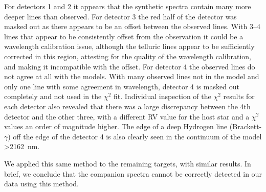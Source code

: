 \documentclass[fleqn,usenatbib]{mnras}
\begin{document}
For detectors 1 and 2 it appears that the synthetic spectra contain many more deeper lines than observed. For detector 3 the red half of the detector was masked out as there appears to be an offset between the observed lines. With 3--4 lines that appear to be consistently offset from the observation it could be a wavelength calibration issue, although the telluric lines appear to be sufficiently corrected in this region, attesting for the quality of the wavelength calibration, and making it incompatible with the offset. For detector 4 the observed lines do not agree at all with the models. With many observed lines not in the model and only one line with some agreement in wavelength, detector 4 is masked out completely and not used in the \(\chi^2\) fit. Individual inspection of the \(\chi^2\) results for each detector also revealed that there was a large discrepancy between the 4th detector and the other three, with a different RV value for the host star and a \(\chi^2\) values an order of magnitude higher. The edge of a deep Hydrogen line (Brackett-\(\gamma\)) off the edge of the detector 4 is also clearly seen in the continuum of the model >2162~nm.

We applied this same method to the remaining targets, with similar results. In brief, we conclude that the companion spectra cannot be correctly detected in our data using this method.
\end{document}

